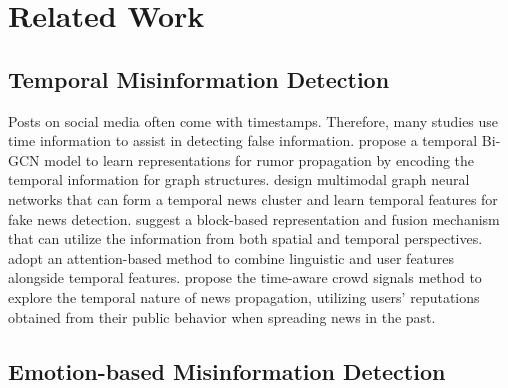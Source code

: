 \section{Related Work}
\subsection{Temporal Misinformation Detection}

Posts on social media often come with timestamps. Therefore, many studies use time information to assist in detecting false information. \citet{nie2021early} propose a temporal Bi-GCN model to learn representations for rumor propagation by encoding the temporal information for graph structures. \citet{qu2024temporal} design multimodal graph neural networks that can form a temporal news cluster and learn temporal features for fake news detection. \citet{guo2022temporal} suggest a block-based representation and fusion mechanism that can utilize the information from both spatial and temporal perspectives. \citet{wakamiya2020fake} adopt an attention-based method to combine linguistic and user features alongside temporal features. \citet{cavalcante2024early} propose the time-aware crowd signals method to explore the temporal nature of news propagation, utilizing users’ reputations obtained from their public behavior when spreading news in the past.



\subsection{Emotion-based Misinformation Detection}

